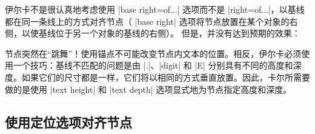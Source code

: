 伊尔卡不是很认真地考虑使用 |base right=of...| 选项而不是 |right=of...|，以基线都在同一条线上的方式对齐节点（ |base right| 选项将节点放置在某个对象的右侧，以使基线位于另一个对象的基线的右侧）。 但是，并没有达到预期的效果：
%
\begin{codeexample}[preamble={\usetikzlibrary{positioning,shapes.misc}}]
\end{codeexample}
%

节点突然在``跳舞''！使用锚点不可能改变节点内文本的位置。相反，伊尔卡必须使用一个技巧：基线不匹配的问题是由 |.|、|digit| 和 |E| 分别具有不同的高度和深度。如果它们的尺寸都是一样，它们将以相同的方式垂直放置。因此，卡尔所需要做的是使用 |text height| 和 |text depth| 选项显式地为节点指定高度和深度。

%
\begin{codeexample}[preamble={\usetikzlibrary{positioning,shapes.misc}}]
\end{codeexample}


\subsection{使用定位选项对齐节点}


